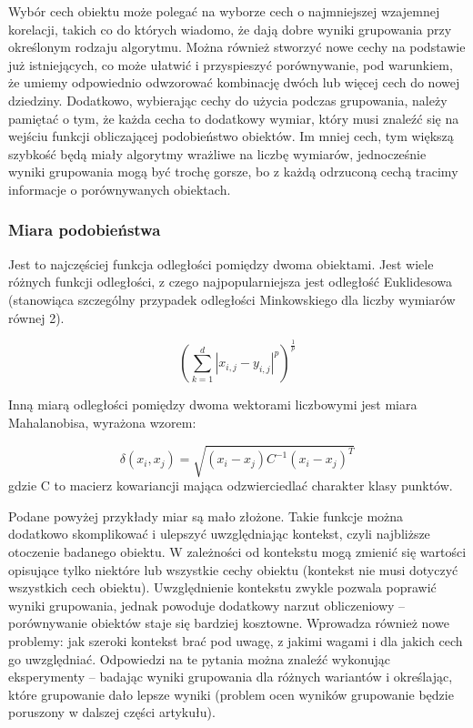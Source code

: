 \documentclass{article}
\begin{document}
Wybór cech obiektu może polegać na wyborze cech o najmniejszej wzajemnej korelacji, takich co do których wiadomo, że dają dobre wyniki grupowania przy określonym rodzaju algorytmu. Można również stworzyć nowe cechy na podstawie już istniejących, co może ułatwić i przyspieszyć porównywanie, pod warunkiem, że umiemy odpowiednio odwzorować kombinację dwóch lub więcej cech do nowej dziedziny. Dodatkowo, wybierając cechy do użycia podczas  grupowania, należy pamiętać o tym, że każda cecha to dodatkowy wymiar, który musi znaleźć się na wejściu funkcji obliczającej podobieństwo obiektów. Im mniej cech, tym większą szybkość będą miały algorytmy wrażliwe na liczbę wymiarów, jednocześnie wyniki grupowania mogą być trochę gorsze, bo z każdą odrzuconą cechą tracimy informacje o porównywanych obiektach.

\subsubsection{Miara podobieństwa}
Jest to najczęściej funkcja odległości pomiędzy dwoma obiektami. Jest wiele różnych funkcji odległości, z czego najpopularniejsza jest odległość Euklidesowa (stanowiąca szczególny przypadek odległości Minkowskiego dla liczby wymiarów równej 2).

\[(\sum_{k=1}^{d} |x_{i,j} - y_{i,j}|^p)^\frac{1}{p}\]


Inną miarą odległości pomiędzy dwoma wektorami liczbowymi jest miara Mahalanobisa, wyrażona wzorem:

\[\delta(x_{i}, x_{j}) = \sqrt{(x_{i} - x_{j})C^{-1}(x_{i} - x_{j})^T} \]
gdzie C to macierz kowariancji mająca odzwierciedlać charakter klasy punktów.

Podane powyżej przykłady miar są mało złożone. Takie funkcje można dodatkowo skomplikować i ulepszyć uwzględniając kontekst, czyli najbliższe otoczenie badanego obiektu. W zależności od kontekstu mogą zmienić się wartości opisujące tylko niektóre lub wszystkie cechy obiektu (kontekst nie musi dotyczyć wszystkich cech obiektu). Uwzględnienie kontekstu zwykle pozwala poprawić wyniki grupowania, jednak powoduje dodatkowy narzut obliczeniowy – porównywanie obiektów staje się bardziej kosztowne. Wprowadza również nowe problemy: jak szeroki kontekst brać pod uwagę, z jakimi wagami i dla jakich cech go uwzględniać. Odpowiedzi na te pytania można znaleźć wykonując eksperymenty – badając wyniki grupowania dla różnych wariantów i określając, które grupowanie dało lepsze wyniki (problem ocen wyników grupowanie będzie poruszony w dalszej części artykułu).
\end{document}
